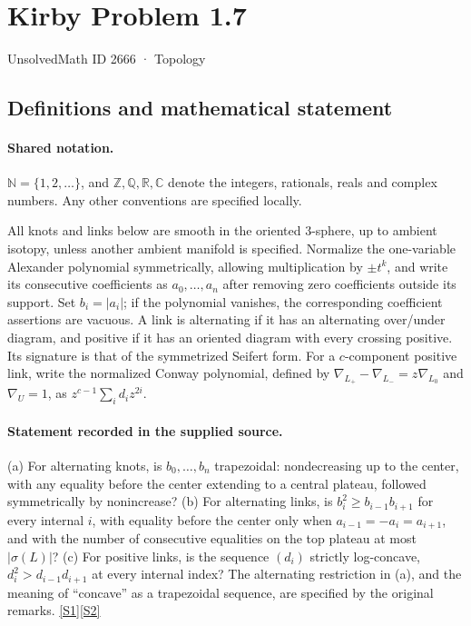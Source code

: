 \documentclass[11pt]{article}
\newcommand{\sref}[2]{\hyperlink{source:#1:#2}{[S#2]}}
\begin{document}
\setcounter{section}{2665}
\section{Kirby Problem 1.7}\label{2666}
{\small\sffamily UnsolvedMath ID 2666 · Topology}
\subsection{Definitions and mathematical statement}

\paragraph{Shared notation.}$\mathbb N=\{1,2,\ldots\}$, and $\mathbb Z,\mathbb Q,\mathbb R,\mathbb C$ denote the integers, rationals, reals and complex numbers. Any other conventions are specified locally.


All knots and links below are smooth in the oriented $3$-sphere, up to ambient isotopy, unless another ambient manifold is specified. Normalize the one-variable Alexander polynomial symmetrically, allowing multiplication by $\pm t^k$, and write its consecutive coefficients as $a_0,\ldots,a_n$ after removing zero coefficients outside its support. Set $b_i=|a_i|$; if the polynomial vanishes, the corresponding coefficient assertions are vacuous. A link is alternating if it has an alternating over/under diagram, and positive if it has an oriented diagram with every crossing positive. Its signature is that of the symmetrized Seifert form. For a $c$-component positive link, write the normalized Conway polynomial, defined by $\nabla_{L_+}-\nabla_{L_-}=z\nabla_{L_0}$ and $\nabla_U=1$, as $z^{c-1}\sum_i d_i z^{2i}$.
\paragraph{Statement recorded in the supplied source.}
(a) For alternating knots, is $b_0,\ldots,b_n$ trapezoidal: nondecreasing up to the center, with any equality before the center extending to a central plateau, followed symmetrically by nonincrease? (b) For alternating links, is $b_i^2\geq b_{i-1}b_{i+1}$ for every internal $i$, with equality before the center only when $a_{i-1}=-a_i=a_{i+1}$, and with the number of consecutive equalities on the top plateau at most $|\sigma(L)|$? (c) For positive links, is the sequence $(d_i)$ strictly log-concave, $d_i^2>d_{i-1}d_{i+1}$ at every internal index? The alternating restriction in (a), and the meaning of ``concave'' as a trapezoidal sequence, are specified by the original remarks. \sref{2666}{1}\sref{2666}{2}
\end{document}
